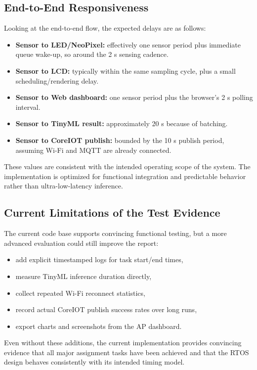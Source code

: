 \subsection{End-to-End Responsiveness}
Looking at the end-to-end flow, the expected delays are as follows:
\begin{itemize}
  \item \textbf{Sensor to LED/NeoPixel:} effectively one sensor period plus
  immediate queue wake-up, so around the 2 s sensing cadence.
  \item \textbf{Sensor to LCD:} typically within the same sampling cycle, plus
  a small scheduling/rendering delay.
  \item \textbf{Sensor to Web dashboard:} one sensor period plus the browser's
  2 s polling interval.
  \item \textbf{Sensor to TinyML result:} approximately 20 s because of
  batching.
  \item \textbf{Sensor to CoreIOT publish:} bounded by the 10 s publish period,
  assuming Wi-Fi and MQTT are already connected.
\end{itemize}

These values are consistent with the intended operating scope of the system.
The implementation is optimized for functional integration and predictable
behavior rather than ultra-low-latency inference.

\subsection{Current Limitations of the Test Evidence}
The current code base supports convincing functional testing, but a more
advanced evaluation could still improve the report:
\begin{itemize}
  \item add explicit timestamped logs for task start/end times,
  \item measure TinyML inference duration directly,
  \item collect repeated Wi-Fi reconnect statistics,
  \item record actual CoreIOT publish success rates over long runs,
  \item export charts and screenshots from the AP dashboard.
\end{itemize}

Even without these additions, the current implementation provides convincing
evidence that all major assignment tasks have been achieved and that the RTOS
design behaves consistently with its intended timing model.
